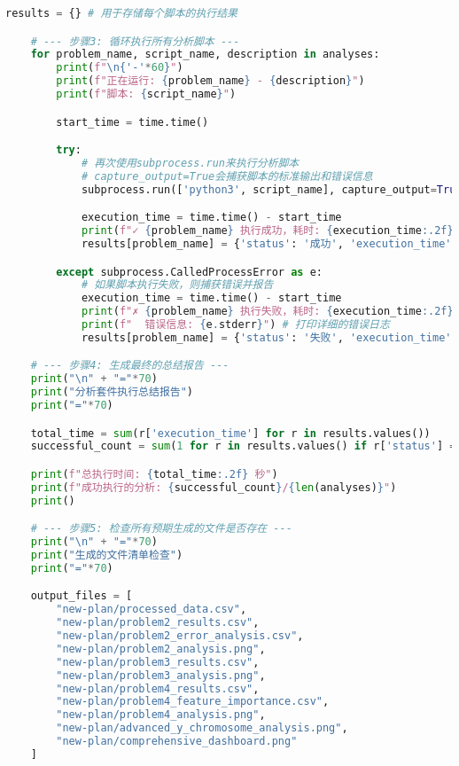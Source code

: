 \documentclass[UTF8, a4paper, 11pt]{ctexart}
\begin{document}
\begin{lstlisting}[language=Python, caption={运行完整分析流程的主脚本。}]
    results = {} # 用于存储每个脚本的执行结果

    # --- 步骤3: 循环执行所有分析脚本 ---
    for problem_name, script_name, description in analyses:
        print(f"\n{'-'*60}")
        print(f"正在运行: {problem_name} - {description}")
        print(f"脚本: {script_name}")

        start_time = time.time()

        try:
            # 再次使用subprocess.run来执行分析脚本
            # capture_output=True会捕获脚本的标准输出和错误信息
            subprocess.run(['python3', script_name], capture_output=True, text=True, check=True)

            execution_time = time.time() - start_time
            print(f"✓ {problem_name} 执行成功，耗时: {execution_time:.2f} 秒")
            results[problem_name] = {'status': '成功', 'execution_time': execution_time}

        except subprocess.CalledProcessError as e:
            # 如果脚本执行失败，则捕获错误并报告
            execution_time = time.time() - start_time
            print(f"✗ {problem_name} 执行失败，耗时: {execution_time:.2f} 秒")
            print(f"  错误信息: {e.stderr}") # 打印详细的错误日志
            results[problem_name] = {'status': '失败', 'execution_time': execution_time}

    # --- 步骤4: 生成最终的总结报告 ---
    print("\n" + "="*70)
    print("分析套件执行总结报告")
    print("="*70)

    total_time = sum(r['execution_time'] for r in results.values())
    successful_count = sum(1 for r in results.values() if r['status'] == '成功')

    print(f"总执行时间: {total_time:.2f} 秒")
    print(f"成功执行的分析: {successful_count}/{len(analyses)}")
    print()

    # --- 步骤5: 检查所有预期生成的文件是否存在 ---
    print("\n" + "="*70)
    print("生成的文件清单检查")
    print("="*70)

    output_files = [
        "new-plan/processed_data.csv",
        "new-plan/problem2_results.csv",
        "new-plan/problem2_error_analysis.csv",
        "new-plan/problem2_analysis.png",
        "new-plan/problem3_results.csv",
        "new-plan/problem3_analysis.png",
        "new-plan/problem4_results.csv",
        "new-plan/problem4_feature_importance.csv",
        "new-plan/problem4_analysis.png",
        "new-plan/advanced_y_chromosome_analysis.png",
        "new-plan/comprehensive_dashboard.png"
    ]


\end{lstlisting}
\end{document}
